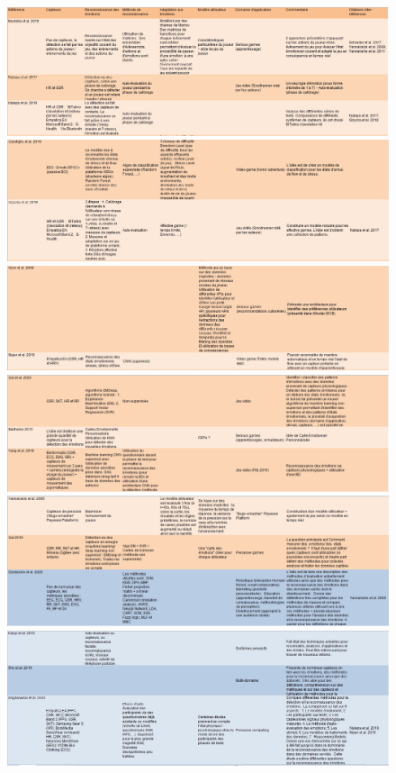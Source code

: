 \documentclass{article}
\begin{document}
		\begin{figure}
			\includegraphics[scale=0.47]{include/tri1.PNG}
			\includegraphics[scale=0.47]{include/tri2.PNG}
			\includegraphics[scale=0.47]{include/tri3.PNG}
			\includegraphics[scale=0.47]{include/tri4.PNG}
			\includegraphics[scale=0.47]{include/tri5.PNG}
			\includegraphics[scale=0.47]{include/tri6.PNG}

\end{figure}
\end{document}
